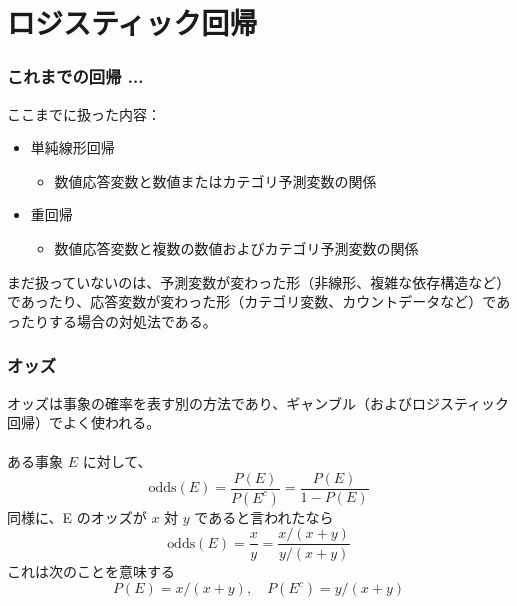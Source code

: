 
\section{ロジスティック回帰}


\begin{frame}
\frametitle{これまでの回帰 ...}

ここまでに扱った内容：

{\small
\begin{itemize}
\item 単純線形回帰
\begin{itemize}
\item 数値応答変数と数値またはカテゴリ予測変数の関係
\end{itemize}
\item 重回帰
\begin{itemize}
\item 数値応答変数と複数の数値およびカテゴリ予測変数の関係
\end{itemize}
\end{itemize}
}

まだ扱っていないのは、予測変数が変わった形（非線形、複雑な依存構造など）であったり、応答変数が変わった形（カテゴリ変数、カウントデータなど）であったりする場合の対処法である。


\end{frame}


\begin{frame}
\frametitle{オッズ}

\vspace{-2mm}

オッズは事象の確率を表す別の方法であり、ギャンブル（およびロジスティック回帰）でよく使われる。\\

~\\

{
ある事象 $E$ に対して、
{\small
\[\text{odds}(E) = \frac{P(E)}{P(E^c)} = \frac{P(E)}{1-P(E)}\]
}
同様に、E のオッズが $x$ 対 $y$ であると言われたなら
{\small
\[\text{odds}(E) = \frac{x}{y} = \frac{x/(x+y)}{y/(x+y)} \]
}
これは次のことを意味する
{\small
\[P(E) = x/(x+y),\quad P(E^c) = y/(x+y)\]
}
}

\end{frame}


